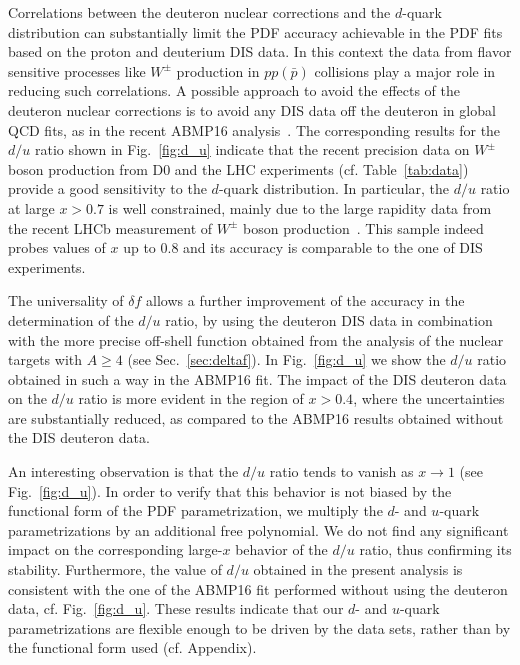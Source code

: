 \documentclass[%
      aps,
      prd,
      floatfix,
      preprintnumbers,
      preprint,
      showpacs,
      nofootinbib,
      tightenlines,
      amssymb,
      amsmath
]{revtex4-1}
\begin{document}
Correlations between the deuteron nuclear corrections and the $d$-quark distribution  
can substantially limit the PDF accuracy achievable in the PDF fits based on the 
proton and deuterium DIS data. 
In this context the data from flavor sensitive processes like $W^\pm$ production in 
$pp(\bar{p})$ collisions play a major role in reducing such correlations. 
A possible approach to avoid the effects of the deuteron nuclear corrections is to avoid any 
DIS data off the deuteron in global QCD fits, as in the recent ABMP16 analysis~\cite{Alekhin:2017kpj}. 
The corresponding results for the $d/u$ ratio shown in Fig.~\ref{fig:d_u} 
indicate that the recent precision data on $W^\pm$ boson production
from D0 and the LHC experiments (cf. Table~\ref{tab:data}) provide a good sensitivity 
to the $d$-quark distribution. 
In particular, the $d/u$ ratio at large $x>0.7$ is well constrained, mainly due to the large rapidity data 
from the recent LHCb measurement of $W^\pm$ boson production~\cite{Aaij:2015gna,Aaij:2015zlq}.  
This sample indeed probes values of $x$ up to 0.8 and its accuracy is comparable to the one of DIS experiments. 

The universality of $\delta f$ allows a further improvement of the accuracy in the determination of the 
$d/u$ ratio, by using the deuteron DIS data in combination with the more precise
off-shell function obtained from the analysis of the nuclear targets with $A\geq4$ (see Sec.~\ref{sec:deltaf}).
In Fig.~\ref{fig:d_u} we show the $d/u$ ratio obtained in such a way in the ABMP16 fit. 
The impact of the DIS deuteron data on the $d/u$ ratio is more evident in the region of $x>0.4$, 
where the uncertainties are substantially reduced, 
as compared to the ABMP16 results obtained without the DIS deuteron data.  

An interesting observation is that the $d/u$ ratio tends to vanish as $x \to 1$ (see Fig.~\ref{fig:d_u}). 
In order to verify that this behavior is not biased by the functional form of the 
PDF parametrization, we multiply the $d$- and $u$-quark parametrizations by an additional free polynomial. 
We do not find any significant impact on the corresponding large-$x$ behavior 
of the $d/u$ ratio, thus confirming its stability. 
Furthermore, the value of $d/u$ obtained in the present analysis is
consistent with the one of the ABMP16 fit performed without using the
deuteron data, cf. Fig.~\ref{fig:d_u}. These results indicate that our $d$- and $u$-quark 
parametrizations are flexible enough to be driven by the data sets, 
rather than by the functional form used (cf. Appendix).
\end{document}
